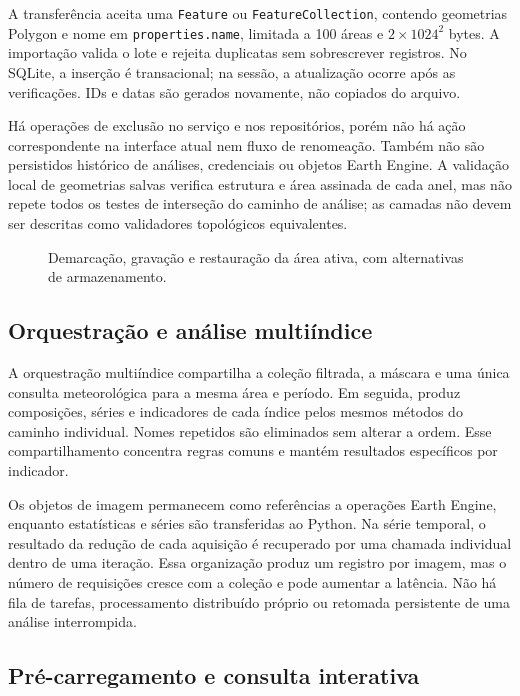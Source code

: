 A transferência aceita uma \texttt{Feature} ou \texttt{FeatureCollection}, contendo geometrias Polygon e nome em \texttt{properties.name}, limitada a 100 áreas e $2\times1024^2$ bytes. A importação valida o lote e rejeita duplicatas sem sobrescrever registros. No SQLite, a inserção é transacional; na sessão, a atualização ocorre após as verificações. IDs e datas são gerados novamente, não copiados do arquivo.

Há operações de exclusão no serviço e nos repositórios, porém não há ação correspondente na interface atual nem fluxo de renomeação. Também não são persistidos histórico de análises, credenciais ou objetos Earth Engine. A validação local de geometrias salvas verifica estrutura e área assinada de cada anel, mas não repete todos os testes de interseção do caminho de análise; as camadas não devem ser descritas como validadores topológicos equivalentes.

\begin{figure}[htbp]
\centering
\resizebox{0.95\textwidth}{!}{}
\caption{Demarcação, gravação e restauração da área ativa, com alternativas de armazenamento.}
\label{fig:fluxo-areas}
\end{figure}

\subsection{Orquestração e análise multiíndice}

A orquestração multiíndice compartilha a coleção filtrada, a máscara e uma única consulta meteorológica para a mesma área e período. Em seguida, produz composições, séries e indicadores de cada índice pelos mesmos métodos do caminho individual. Nomes repetidos são eliminados sem alterar a ordem. Esse compartilhamento concentra regras comuns e mantém resultados específicos por indicador.

Os objetos de imagem permanecem como referências a operações Earth Engine, enquanto estatísticas e séries são transferidas ao Python. Na série temporal, o resultado da redução de cada aquisição é recuperado por uma chamada individual dentro de uma iteração. Essa organização produz um registro por imagem, mas o número de requisições cresce com a coleção e pode aumentar a latência. Não há fila de tarefas, processamento distribuído próprio ou retomada persistente de uma análise interrompida.

\subsection{Pré-carregamento e consulta interativa}\label{sec:hover-final}

